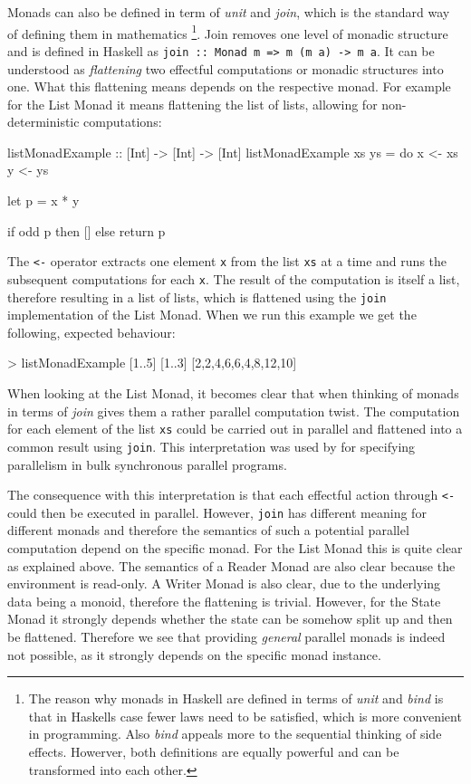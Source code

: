 Monads can also be defined in term of \textit{unit} and \textit{join}, which is the standard way of defining them in mathematics \footnote{The reason why monads in Haskell are defined in terms of \textit{unit} and \textit{bind} is that in Haskells case fewer laws need to be satisfied, which is more convenient in programming. Also \textit{bind} appeals more to the sequential thinking of side effects. Howerver, both definitions are equally powerful and can be transformed into each other.}. Join removes one level of monadic structure and is defined in Haskell as \texttt{join :: Monad m => m (m a) -> m a}. It can be understood as \textit{flattening} two effectful computations or monadic structures into one. What this flattening means depends on the respective monad. For example for the List Monad it means flattening the list of lists, allowing for non-deterministic computations:

\begin{HaskellCode}
listMonadExample :: [Int] -> [Int] -> [Int]
listMonadExample xs ys = do
  x <- xs
  y <- ys
  
  let p = x * y

  if odd p
    then []
    else return p
\end{HaskellCode}

The \texttt{<-} operator extracts one element \texttt{x} from the list \texttt{xs} at a time and runs the subsequent computations for each \texttt{x}. The result of the computation is itself a list, therefore resulting in a list of lists, which is flattened using the \texttt{join} implementation of the List Monad. When we run this example we get the following, expected behaviour:

\begin{HaskellCode}
> listMonadExample [1..5] [1..3]
[2,2,4,6,6,4,8,12,10]
\end{HaskellCode}

When looking at the List Monad, it becomes clear that when thinking of monads in terms of \textit{join} gives them a rather parallel computation twist. The computation for each element of the list \texttt{xs} could be carried out in parallel and flattened into a common result using \texttt{join}. This interpretation was used by \cite{botta2007relation} for specifying parallelism in bulk synchronous parallel programs.

The consequence with this interpretation is that each effectful action through \texttt{<-} could then be executed in parallel. However, \texttt{join} has different meaning for different monads and therefore the semantics of such a potential parallel computation depend on the specific monad. For the List Monad this is quite clear as explained above. The semantics of a Reader Monad are also clear because the environment is read-only. A Writer Monad is also clear, due to the underlying data being a monoid, therefore the flattening is trivial. However, for the State Monad it strongly depends whether the state can be somehow split up and then be flattened. Therefore we see that providing \textit{general} parallel monads is indeed not possible, as it strongly depends on the specific monad instance.

